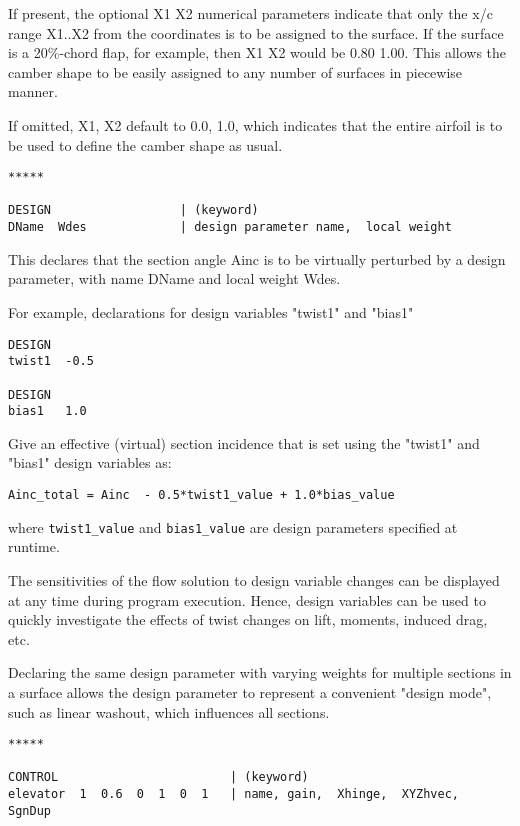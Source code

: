 If present, the optional X1 X2 numerical parameters indicate that only 
the x/c range X1..X2 from the coordinates is to be assigned to the surface.
If the surface is a 20\%-chord flap, for example, then X1 X2
would be 0.80 1.00.  This allows the camber shape to be easily 
assigned to any number of surfaces in piecewise manner.  

If omitted,  X1, X2  default to  0.0, 1.0, which indicates that the
entire airfoil is to be used to define the camber shape as usual.\\

\begin{lstlisting}
*****

DESIGN                  | (keyword)
DName  Wdes             | design parameter name,  local weight

\end{lstlisting}

This declares that the section angle Ainc is to be virtually perturbed 
by a design parameter, with name DName and local weight Wdes.  

For example, declarations for design variables "twist1" and "bias1"
\begin{lstlisting}
DESIGN
twist1  -0.5

DESIGN 
bias1   1.0

\end{lstlisting}


Give an effective (virtual) section incidence that is set using the "twist1" 
and "bias1" design variables as:

\begin{lstlisting}
Ainc_total = Ainc  - 0.5*twist1_value + 1.0*bias_value
\end{lstlisting}

where \lstinline!twist1_value! and \lstinline!bias1_value! are design parameters specified at runtime.

The sensitivities of the flow solution to design variable changes
can be displayed at any time during program execution.  Hence,
design variables can be used to quickly investigate the effects
of twist changes on lift, moments, induced drag, etc.

Declaring the same design parameter with varying weights for multiple 
sections in a surface allows the design parameter to represent a convenient 
"design mode", such as linear washout, which influences all sections.

{\tiny \begin{lstlisting}
*****

CONTROL                        | (keyword)
elevator  1  0.6  0  1  0  1   | name, gain,  Xhinge,  XYZhvec,  SgnDup

\end{lstlisting}}

